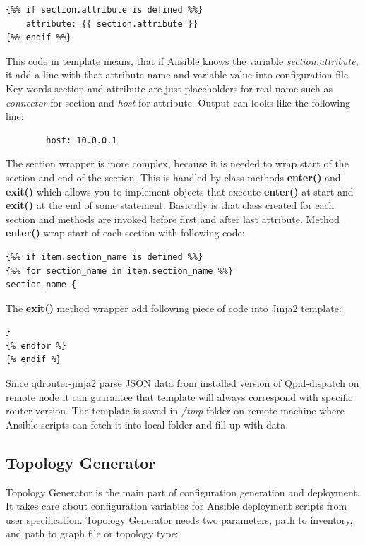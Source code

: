 \begin{verbatim}
{%% if section.attribute is defined %%}
    attribute: {{ section.attribute }}
{%% endif %%}
\end{verbatim}

This code in template means, that if Ansible knows the variable \emph{section.attribute}, it add a line with that attribute name and variable value into configuration file. Key words section and attribute are just placeholders for real name such as \emph{connector} for section and \emph{host} for attribute. Output can looks like the following line:

\begin{verbatim}
		host: 10.0.0.1
\end{verbatim}

The section wrapper is more complex, because it is needed to wrap start of the section and end of the section. This is handled by class methods \textbf{\textunderscore enter\textunderscore ()} and \textbf{\textunderscore exit\textunderscore ()} which allows you to implement objects that execute \textbf{\textunderscore enter\textunderscore ()} at start and \textbf{\textunderscore exit\textunderscore ()} at the end of some statement. Basically is that class created for each section and methods are invoked before first and after last attribute. Method \textbf{\textunderscore enter\textunderscore ()} wrap start of each section with following code:

\begin{verbatim}
{%% if item.section_name is defined %%}
{%% for section_name in item.section_name %%}
section_name {
\end{verbatim}

The \textbf{\textunderscore exit\textunderscore ()} method wrapper add following piece of code into Jinja2 template:
\begin{verbatim}
}
{% endfor %}
{% endif %}
\end{verbatim}

Since qdrouter-jinja2 parse JSON data from installed version of Qpid-dispatch on remote node it can guarantee that template will always correspond with specific router version. The template is saved in \emph{/tmp} folder on remote machine where Ansible scripts can fetch it into local folder and fill-up with data.


\subsection{Topology Generator}
Topology Generator is the main part of configuration generation and deployment. It takes care about configuration variables for Ansible deployment scripts from user specification. Topology Generator needs two parameters, path to inventory, and path to graph file or topology type:

